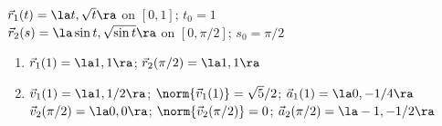 {$\vec r_1(t) = \la t,\sqrt{t}\ra$ on $[0,1]$; $t_0 = 1$\\
$\vec r_2(s) = \la \sin t,\sqrt{\sin t}\ra$ on $[0,\pi/2]$; $s_0 = \pi/2$
}
{
\begin{enumerate}
	\item $\vec r_1(1) = \la 1,1\ra$; $\vec r_2(\pi/2) = \la 1,1\ra$
	\item	$\vec v_1(1) = \la 1,1/2\ra$; $\norm{\vec v_1(1)} = \sqrt{5}/2$; $\vec a_1(1) = \la 0,-1/4\ra$\\
			$\vec v_2(\pi/2) = \la 0,0\ra$; $\norm{\vec v_2(\pi/2)} = 0$; $\vec a_2(\pi/2) = \la -1,-1/2\ra$
\end{enumerate}
}